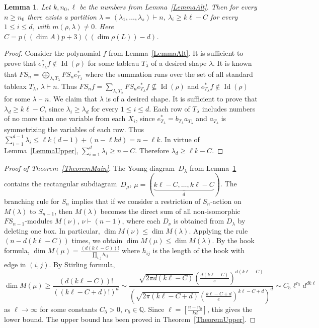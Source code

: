 \documentclass[12pt, reqno, a4paper]{amsart}
\theoremstyle{plain}
\newtheorem{lemma}{Lemma}
\theoremstyle{remark}
\theoremstyle{definition}
\begin{document}
\begin{lemma}\label{LemmaCochar} Let
 $k, n_0,\ell$ be the numbers from
Lemma~\ref{LemmaAlt}.   Then for every $n \geqslant n_0$ there exists
a partition $\lambda = (\lambda_1, \ldots, \lambda_s) \vdash n$,
$\lambda_i \geqslant k\ell-C$ for every $1 \leqslant i \leqslant d$,
with $m(\rho, \lambda) \ne 0$.
Here $C = p((\dim A)p + 3)((\dim\rho(L))-d)$.
\end{lemma}
\begin{proof}
Consider the polynomial $f$ from Lemma~\ref{LemmaAlt}.
It is sufficient to prove that $e^*_{T_\lambda} f \notin \operatorname{Id}(\rho)$
for some tableau $T_\lambda$ of a desired shape $\lambda$.
It is known that $FS_n = \bigoplus_{\lambda,T_\lambda} FS_n e^{*}_{T_\lambda}$ where the summation
runs over the set of all standard tableax $T_\lambda$,
$\lambda \vdash n$. Thus $FS_n f = \sum_{\lambda,T_\lambda} FS_n e^{*}_{T_\lambda}f
\not\subseteq \operatorname{Id}(\rho)$ and $e^{*}_{T_\lambda} f \notin \operatorname{Id}(\rho)$ for some $\lambda \vdash n$.
We claim that $\lambda$ is of a desired shape.
It is sufficient to prove that
$\lambda_d \geqslant k\ell-C$, since
$\lambda_i \geqslant \lambda_d$ for every $1 \leqslant i \leqslant d$.
Each row of $T_\lambda$ includes numbers
of no more than one variable from each $X_i$,
since $e^{*}_{T_\lambda} = b_{T_\lambda} a_{T_\lambda}$
and $a_{T_\lambda}$ is symmetrizing the variables of each row.
Thus $\sum_{i=1}^{d-1} \lambda_i \leqslant \ell k(d-1) + (n-\ell kd) = n-\ell k$.
In virtue of Lemma~\ref{LemmaUpper},
$\sum_{i=1}^d \lambda_i \geqslant n-C$. Therefore
$\lambda_d \geqslant \ell k-C$.
\end{proof}

\begin{proof}[Proof of Theorem~\ref{TheoremMain}]
The Young diagram~$D_\lambda$ from Lemma~\ref{LemmaCochar} contains
the rectangular subdiagram~$D_\mu$, $\mu=(\underbrace{k\ell-C, \ldots, k\ell-C}_d)$.
The branching rule for $S_n$ implies that if we consider a restriction of
$S_n$-action on $M(\lambda)$ to $S_{n-1}$, then
$M(\lambda)$ becomes the direct sum of all non-isomorphic
$FS_{n-1}$-modules $M(\nu)$, $\nu \vdash (n-1)$, where each $D_\nu$ is obtained
from $D_\lambda$ by deleting one box. In particular,
$\dim M(\nu) \leqslant \dim M(\lambda)$.
Applying the rule $(n-d(k\ell-C))$ times, we obtain $\dim M(\mu) \leqslant \dim M(\lambda)$.
By the hook formula, $\dim M(\mu) = \frac{(d(k\ell-C))!}{\prod_{i,j} h_{ij}}$
where $h_{ij}$ is the length of the hook with edge in $(i, j)$.
By Stirling formula,
$$\dim M(\mu) \geqslant \frac{(d(k\ell-C))!}{((k\ell-C+d)!)^d}
\sim \frac{
\sqrt{2\pi d(k\ell-C)} \left(\frac{d(k\ell-C)}{e}\right)^{d(k\ell-C)}
}
{
\left(\sqrt{2\pi (k\ell-C+d)}
\left(\frac{k\ell-C+d}{e}\right)^{k\ell-C+d}\right)^d
} \sim C_5 \ell^{r_5} d^{dk\ell}$$ as $\ell \to \infty$
for some constants $C_5 > 0$, $r_5 \in \mathbb Q$.
Since $\ell = \left[\frac{n-n_0}{kd}\right]$,
this gives the lower bound.
The upper bound has been proved in Theorem~\ref{TheoremUpper}.
\end{proof}
\end{document}
